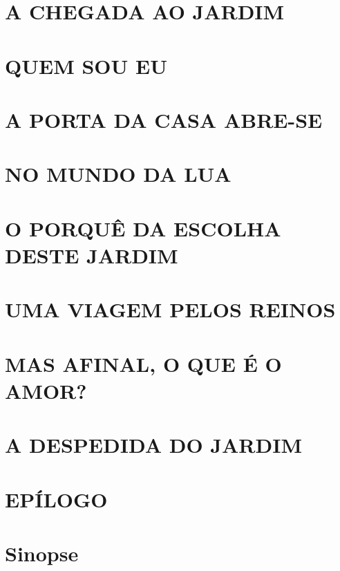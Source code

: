 \documentclass[12pt, a4paper, twoside]{memoir}
\begin{document}
\chapter{A CHEGADA AO JARDIM}


\chapter{QUEM SOU EU}


\chapter{A PORTA DA CASA ABRE-SE}


\chapter{NO MUNDO DA LUA}


\chapter{O PORQUÊ DA ESCOLHA DESTE JARDIM}


\chapter{UMA VIAGEM PELOS REINOS}


\chapter{MAS AFINAL, O QUE É O AMOR?}


\chapter{A DESPEDIDA DO JARDIM}


\chapter{EPÍLOGO}



\chapter{Sinopse}

\end{document}
